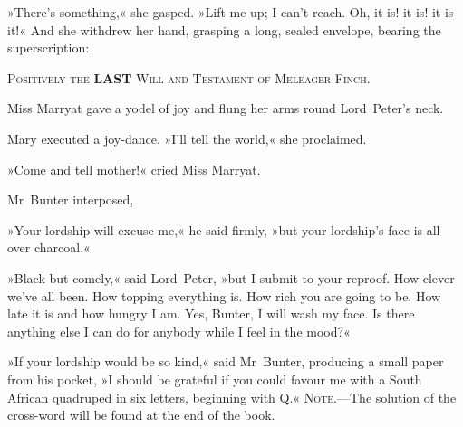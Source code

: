 »There's something,« she gasped. »Lift me up; I can't reach. Oh, it is! it is! it is it!« And she withdrew her hand, grasping a long, sealed envelope, bearing the superscription:

\begin{center}\scshape\large
Positively the \textbf{LAST} Will and Testament of Meleager Finch.
\end{center}

Miss Marryat gave a yodel of joy and flung her arms round Lord~Peter's neck.

Mary executed a joy-dance. »I'll tell the world,« she proclaimed.

»Come and tell mother!« cried Miss Marryat.

Mr~Bunter interposed,

»Your lordship will excuse me,« he said firmly, »but your lordship's face is all over charcoal.«

»Black but comely,« said Lord~Peter, »but I submit to your reproof. How clever we've all been. How topping everything is. How rich you are going to be. How late it is and how hungry I am. Yes, Bunter, I will wash my face. Is there anything else I can do for anybody while I feel in the mood?«

»If your lordship would be so kind,« said Mr~Bunter, producing a small paper from his pocket, »I should be grateful if you could favour me with a South African quadruped in six letters, beginning with Q\@.«
\vfill
\textsc{Note}.—The solution of the cross-word will be found at the end of the book.